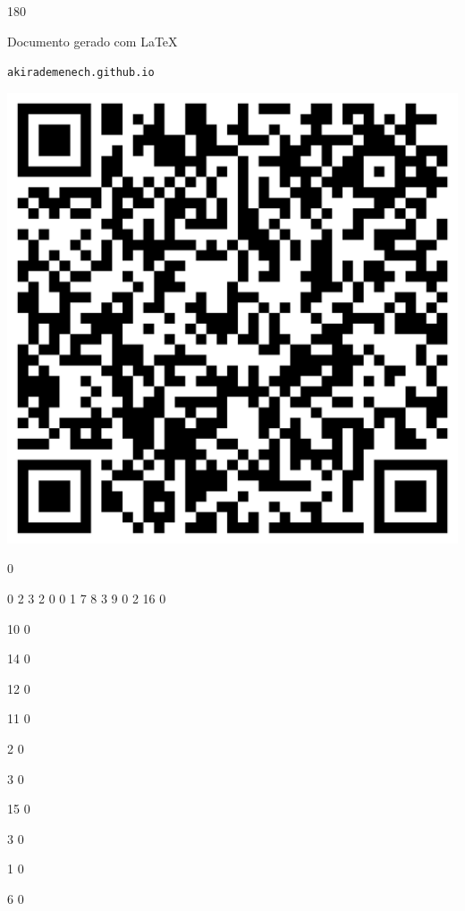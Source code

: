 \documentclass[12pt]{article}
\begin{document}
	\begin{turn}{180}	
		\begin{minipage}{\textwidth}		  
		  Documento gerado com \LaTeX			
		  
		  \texttt{akirademenech.github.io}

		  \includegraphics[height=0.3\textheight]{2e-2.pdf}

		\end{minipage}	
	\end{turn}  
		  
		\vfill  
		  
{
	0	%

	0	%
	2	%
	3	%
	2	%
	0	%
	0	%
	1	%
	7	%
	8	%
	3	%
	9	%
	0	%
	2	%
	16	%
	0	%

	10	%
	0	%

	14	%
	0	%

	12	%
	0	%

	11	%
	0	%

	2	%
	0	%

	3	%
	0	%

	15	%
	0	%

	3	%
	0	%

	1	%
	0	%

	6	%
	0	%

}	  
		    	
\end{document}
